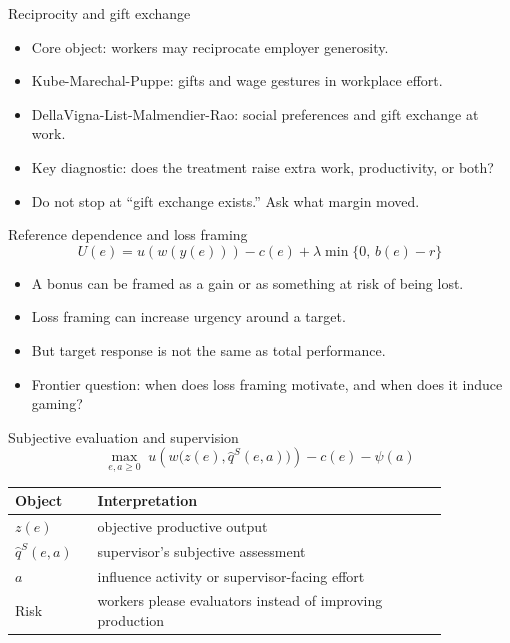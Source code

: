 \documentclass[aspectratio=169,11pt]{beamer}
\begin{document}
\begin{frame}{Reciprocity and gift exchange}
\begin{itemize}
    \item Core object: workers may reciprocate employer generosity.
    \item Kube-Marechal-Puppe: gifts and wage gestures in workplace effort.
    \item DellaVigna-List-Malmendier-Rao: social preferences and gift exchange at work.
    \item Key diagnostic: does the treatment raise extra work, productivity, or both?
    \item Do not stop at ``gift exchange exists.'' Ask what margin moved.
\end{itemize}
\end{frame}

\begin{frame}{Reference dependence and loss framing}
\[
U(e) = u\!\left(w(y(e))\right) - c(e)
  + \lambda \min\{0,\, b(e)-r\}
\]

\begin{itemize}
    \item A bonus can be framed as a gain or as something at risk of being lost.
    \item Loss framing can increase urgency around a target.
    \item But target response is not the same as total performance.
    \item Frontier question: when does loss framing motivate, and when does it induce gaming?
\end{itemize}
\end{frame}

\begin{frame}{Subjective evaluation and supervision}
\[
\max_{e,a \ge 0} \; u\!\left(w\big(z(e), \hat q^S(e,a)\big)\right)
  - c(e) - \psi(a)
\]

\small
\begin{tabular}{p{0.16\linewidth} p{0.70\linewidth}}
\toprule
Object & Interpretation \\
\midrule
$z(e)$ & objective productive output \\
$\hat q^S(e,a)$ & supervisor's subjective assessment \\
$a$ & influence activity or supervisor-facing effort \\
Risk & workers please evaluators instead of improving production \\
\bottomrule
\end{tabular}
\end{frame}
\end{document}
